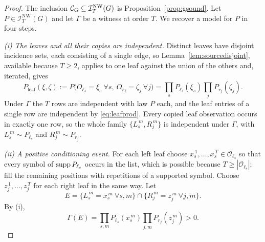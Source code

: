 \documentclass[11pt]{article}
\theoremstyle{plain}
\theoremstyle{definition}
\newcommand{\INW}{\mathcal I^{\mathrm{NW}}}
\begin{document}
\begin{proof}
The inclusion $\Cscen{G}\subseteq\INW_T(G)$ is Proposition~\ref{prop:gsound}. Let $P\in\INW_T(G)$ and let $\Gamma$ be a witness at order $T$. We recover a model for $P$ in four steps.

\medskip
\emph{(i) The leaves and all their copies are independent.}
Distinct leaves have disjoint incidence sets, each consisting of a single edge, so Lemma~\ref{lem:sourcedisjoint}, available because $T\ge2$, applies to one leaf against the union of the others and, iterated, gives
\begin{equation}\label{eq:leafprod}
P_{\mathrm{leaf}}(\xi,\zeta):=P\bigl(O_{\ell_s}=\xi_s\ \forall s,\ O_{r_j}=\zeta_j\ \forall j\bigr)=\prod_{s}P_{\ell_s}(\xi_s)\prod_{j}P_{r_j}(\zeta_j).
\end{equation}
Under $\Gamma$ the $T$ rows are independent with law $P$ each, and the leaf entries of a single row are independent by \eqref{eq:leafprod}. Every copied leaf observation occurs in exactly one row, so the whole family $\{L_s^{\,m},R_j^{\,m}\}$ is independent under $\Gamma$, with $L_s^{\,m}\sim P_{\ell_s}$ and $R_j^{\,m}\sim P_{r_j}$.

\medskip
\emph{(ii) A positive conditioning event.}
For each left leaf choose $x_s^{\,1},\dots,x_s^{\,T}\in\mathcal O_{\ell_s}$ so that every symbol of $\operatorname{supp} P_{\ell_s}$ occurs in the list, which is possible because $T\ge|\mathcal O_{\ell_s}|$; fill the remaining positions with repetitions of a supported symbol. Choose $z_j^{\,1},\dots,z_j^{\,T}$ for each right leaf in the same way. Let
\[
E=\bigl\{L_s^{\,m}=x_s^{\,m}\ \forall s,m\bigr\}\cap\bigl\{R_j^{\,m}=z_j^{\,m}\ \forall j,m\bigr\}.
\]
By (i),
\begin{equation}\label{eq:QE}
\Gamma(E)=\prod_{s,m}P_{\ell_s}(x_s^{\,m})\prod_{j,m}P_{r_j}(z_j^{\,m})>0.
\end{equation}


\end{proof}
\end{document}
